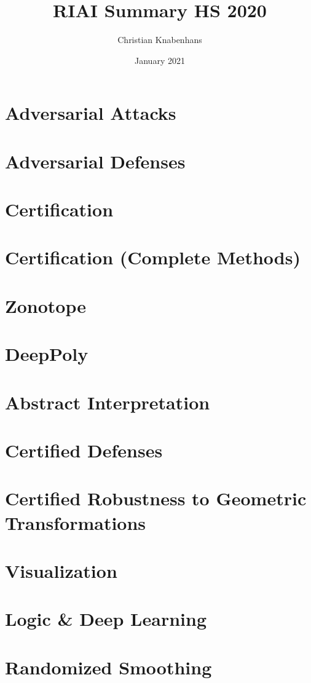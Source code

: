 \documentclass[11pt]{article}
\title{RIAI Summary HS 2020}
\author{Christian Knabenhans}
\date{January 2021}
\begin{document}
\pagestyle{empty}
\begin{multicols*}{3}
\section*{Adversarial Attacks}

\section*{Adversarial Defenses}

\section*{Certification}

\section*{Certification (Complete Methods)}

\section*{Zonotope}

\section*{DeepPoly}

\section*{Abstract Interpretation}
\section*{Certified Defenses}
\section*{Certified Robustness to Geometric Transformations}
\section*{Visualization}
\section*{Logic \& Deep Learning}
\section*{Randomized Smoothing}
\end{multicols*}
\end{document}
